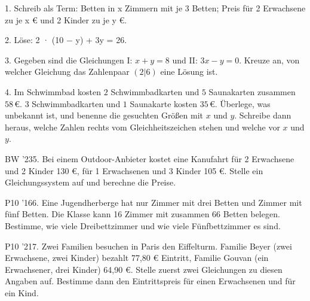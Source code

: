 \documentclass[11pt]{article}
\begin{document}
\pfheftstil
{}
\pfrueckblick
\begin{pfaufg}{}{1.}{}
Schreib als Term: Betten in x Zimmern mit je 3 Betten; Preis für 2 Erwachsene zu je x € und 2 Kinder zu je y €.
\end{pfaufg}
\begin{pfaufg}{}{2.}{}
Löse: 2 · (10 $-$ y) + 3y = 26.
\end{pfaufg}
\pfgruppe{}
\begin{pfaufg}{}{3.}{}
Gegeben sind die Gleichungen I: $x + y = 8$ und II: $3x - y = 0$. Kreuze an, von welcher Gleichung das Zahlenpaar $(2|6)$ eine Lösung ist.
\end{pfaufg}
\begin{pfaufg}{}{4.}{}
Im Schwimmbad kosten $2$ Schwimmbadkarten und $5$ Saunakarten zusammen $58\,€$. $3$ Schwimmbadkarten und $1$ Saunakarte kosten $35\,€$. Überlege, was unbekannt ist, und benenne die gesuchten Größen mit $x$ und $y$. Schreibe dann heraus, welche Zahlen rechts vom Gleichheitszeichen stehen und welche vor $x$ und $y$.
\end{pfaufg}
\pfgruppe{}
\begin{pfaufg}{BW ’23}{5.}{}
Bei einem Outdoor-Anbieter kostet eine Kanufahrt für 2 Erwachsene und 2 Kinder 130 €, für 1 Erwachsenen und 3 Kinder 105 €. Stelle ein Gleichungssystem auf und berechne die Preise.
\end{pfaufg}
\begin{pfaufg}{P10 ’16}{\llap{\textasteriskcentered\,}6.}{}
Eine Jugendherberge hat nur Zimmer mit drei Betten und Zimmer mit fünf Betten. Die Klasse kann 16 Zimmer mit zusammen 66 Betten belegen. Bestimme, wie viele Dreibettzimmer und wie viele Fünfbettzimmer es sind.
\end{pfaufg}
\pfgruppe{}
\begin{pfaufg}{P10 ’21}{7.}{}
Zwei Familien besuchen in Paris den Eiffelturm. Familie Beyer (zwei Erwachsene, zwei Kinder) bezahlt 77,80 € Eintritt, Familie Gouvan (ein Erwachsener, drei Kinder) 64,90 €. Stelle zuerst zwei Gleichungen zu diesen Angaben auf. Bestimme dann den Eintrittspreis für einen Erwachsenen und für ein Kind.
\par\smallskip\noindent {}\par
{}
\end{pfaufg}
\end{document}
